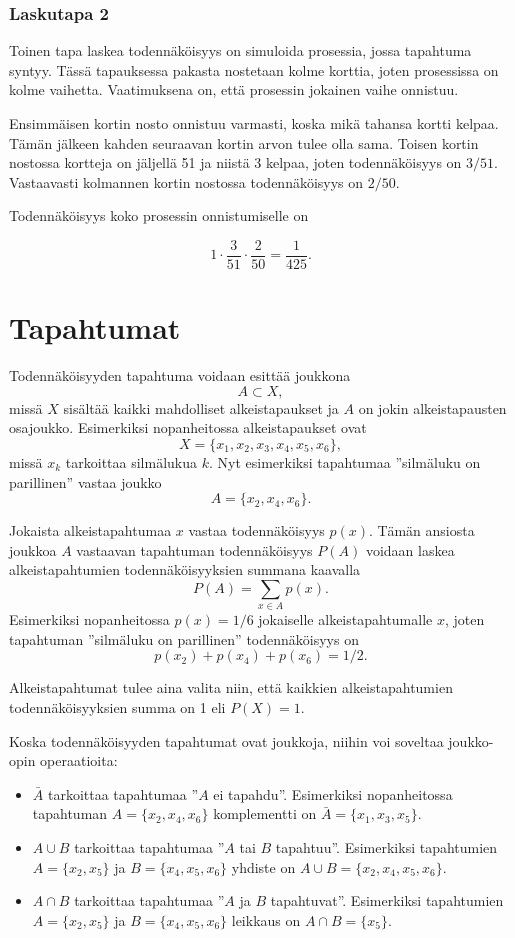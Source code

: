 \subsubsection*{Laskutapa 2}

Toinen tapa laskea todennäköisyys on simuloida prosessia,
jossa tapahtuma syntyy.
Tässä tapauksessa pakasta nostetaan kolme korttia,
joten prosessissa on kolme vaihetta.
Vaatimuksena on, että prosessin jokainen vaihe onnistuu.

Ensimmäisen kortin nosto onnistuu varmasti,
koska mikä tahansa kortti kelpaa.
Tämän jälkeen kahden seuraavan kortin
arvon tulee olla sama.
Toisen kortin nostossa kortteja on jäljellä 51
ja niistä 3 kelpaa, joten todennäköisyys on $3/51$.
Vastaavasti kolmannen kortin nostossa
todennäköisyys on $2/50$.

Todennäköisyys koko prosessin onnistumiselle on

\[1 \cdot \frac{3}{51} \cdot \frac{2}{50} = \frac{1}{425}.\]

\section{Tapahtumat}

Todennäköisyyden tapahtuma
voidaan esittää joukkona
\[A \subset X,\]
missä $X$ sisältää kaikki mahdolliset alkeistapaukset
ja $A$ on jokin alkeistapausten osajoukko.
Esimerkiksi nopanheitossa alkeistapaukset ovat
\[X = \{x_1,x_2,x_3,x_4,x_5,x_6\},\]
missä $x_k$ tarkoittaa silmälukua $k$.
Nyt esimerkiksi tapahtumaa ''silmäluku on parillinen''
vastaa joukko
\[A = \{x_2,x_4,x_6\}.\]

Jokaista alkeistapahtumaa $x$
vastaa todennäköisyys $p(x)$.
Tämän ansiosta joukkoa $A$ vastaavan tapahtuman
todennäköisyys $P(A)$ voidaan
laskea alkeistapahtumien todennäköisyyksien
summana kaavalla
\[P(A) = \sum_{x \in A} p(x).\]
Esimerkiksi nopanheitossa $p(x)=1/6$
jokaiselle alkeistapahtumalle $x$, joten
tapahtuman ''silmäluku on parillinen''
todennäköisyys on
\[p(x_2)+p(x_4)+p(x_6)=1/2.\]

Alkeistapahtumat tulee aina valita niin,
että kaikkien alkeistapahtumien
todennäköisyyksien summa on 1 eli $P(X)=1$.

Koska todennäköisyyden tapahtumat ovat joukkoja,
niihin voi soveltaa jouk\-ko-opin operaatioita:

\begin{itemize}
\item {} $\bar A$ tarkoittaa
tapahtumaa ''$A$ ei tapahdu''. 
Esimerkiksi nopanheitossa tapahtuman
$A=\{x_2,x_4,x_6\}$ komplementti on
$\bar A = \{x_1,x_3,x_5\}$.
\item {} $A \cup B$ tarkoittaa
tapahtumaa ''$A$ tai $B$ tapahtuu''.
Esimerkiksi tapahtumien $A=\{x_2,x_5\}$
ja $B=\{x_4,x_5,x_6\}$ yhdiste on
$A \cup B = \{x_2,x_4,x_5,x_6\}$.
\item {} $A \cap B$ tarkoittaa
tapahtumaa ''$A$ ja $B$ tapahtuvat''.
Esimerkiksi tapahtumien $A=\{x_2,x_5\}$
ja $B=\{x_4,x_5,x_6\}$ leikkaus on
$A \cap B = \{x_5\}$.
\end{itemize}

